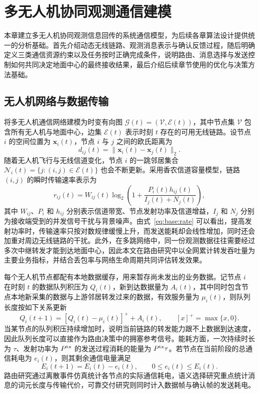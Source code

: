\chapter{多无人机协同观测通信建模}
\label{ch:foundations}

本章建立多无人机协同观测信息回传的系统通信模型，为后续各章算法设计提供统一的分析基础。首先介绍动态无线链路、观测消息表示与确认反馈过程，随后明确定义三类通信资源约束以及任务按时正确完成条件，说明路由、消息选择与发送控制如何共同决定地面中心的最终接收结果，最后介绍后续章节使用的优化与决策方法基础。

\section{无人机网络与数据传输}

将多无人机通信网络建模为时变有向图 $\mathcal G(t)=(\mathcal V,\mathcal E(t))$，其中节点集 $\mathcal V$ 包含所有无人机与地面中心，边集 $\mathcal E(t)$ 表示时刻 $t$ 存在的可用无线链路。设节点 $i$ 的空间位置为 $\bm x_i(t)$，节点 $i$ 与 $j$ 之间的欧氏距离为
\begin{equation}
d_{ij}(t)=\|\bm x_i(t)-\bm x_j(t)\|_2.
\label{eq:base:distance}
\end{equation}
随着无人机飞行与无线信道变化，节点 $i$ 的一跳邻居集合 $\mathcal N_i(t)=\{j:(i,j)\in\mathcal E(t)\}$ 也会不断更新。采用香农信道容量模型，链路 $(i,j)$ 的瞬时传输速率表示为
\begin{equation}
r_{ij}(t)=W_{ij}(t)\log_2\left(1+
\frac{P_i(t)h_{ij}(t)}{I_j(t)+N_j(t)}\right),
\label{eq:base:rate}
\end{equation}
其中 $W_{ij}$、$P_i$ 和 $h_{ij}$ 分别表示信道带宽、节点发射功率及信道增益，$I_j$ 和 $N_j$ 分别为接收端受到的并发信号干扰与背景噪声。由式~\eqref{eq:base:rate} 可以看出，提高发射功率时，传输速率只按对数规律缓慢上升，而发送能耗却会线性增加，同时还会加重对周边无线链路的干扰。此外，在多跳网络中，同一份观测数据往往需要经过多次中继转发才能到达地面中心，因此本文在路由研究中以全网累计转发吞吐量为主要业务指标，并结合丢包率与网络生命周期共同评估转发效果。

每个无人机节点都配有本地数据缓存，用来暂存尚未发出的业务数据。记节点 $i$ 在时刻 $t$ 的数据队列积压为 $Q_i(t)$，新到达数据量为 $A_i(t)$，其中同时包含节点本地新采集的数据与上游邻居转发过来的数据，有效服务量为 $\mu_i(t)$，则队列长度按如下关系更新
\begin{equation}
Q_i(t+1)=\left[Q_i(t)-\mu_i(t)\right]^++A_i(t),
\qquad [x]^+=\max\{x,0\}.
\label{eq:base:queue}
\end{equation}
当某节点的队列积压持续增加时，说明当前链路的转发能力跟不上数据到达速度，因此队列长度可以直接作为路由决策中的拥塞参考信号。能耗方面，一次持续时长为 $\tau$、发射功率为 $P^{\rm tx}$ 的发送过程消耗的能量为 $P^{\rm tx}\tau$。若节点在当前阶段的总通信耗电为 $e_i(t)$，则其剩余通信电量满足
\begin{equation}
E_i(t+1)=E_i(t)-e_i(t),\qquad 0\le e_i(t)\le E_i(t).
\label{eq:base:energy}
\end{equation}
路由研究通过离散事件仿真统计各节点的实际通信耗电，语义选择研究重点统计消息的词元长度与传输代价，可靠交付研究则同时计入数据帧与确认帧的发送耗电。

